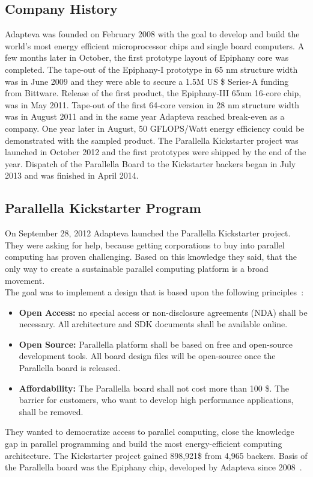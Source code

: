 \documentclass[american, hauptseminar, twoside]{zihpub}
\begin{document}
		\subsection{Company History}
			Adapteva was founded on February 2008 with the goal to develop and build the world's most energy efficient microprocessor chips and single board computers. A few months later in October, the first prototype layout of Epiphany core was completed. The tape-out of the Epiphany-I prototype in 65 nm structure width was in June 2009 and they were able to secure a 1.5M US \$ Series-A funding from Bittware. Release of the first product, the Epiphany-III 65nm 16-core chip, was in May 2011. Tape-out of the first 64-core version in 28 nm structure width was in August 2011 and in the same year Adapteva reached break-even as a company. One year later in August, 50 GFLOPS/Watt energy efficiency could be demonstrated with the sampled product.
			The Parallella Kickstarter project was launched in October 2012 and the first prototypes were shipped by the end of the year. Dispatch of the Parallella Board to the Kickstarter backers began in July 2013 and was finished in April 2014.~\cite{Adaptev2015}
			
		\subsection{Parallella Kickstarter Program}
			On September 28, 2012 Adapteva launched the Parallella Kickstarter project. They were asking for help, because getting corporations to buy into parallel computing has proven challenging. Based on this knowledge they said, that the only way to create a sustainable parallel computing platform is a broad movement. 
			\\
			The goal was to implement a design that is based upon the following principles~\cite{Adaptev2012}:
			\begin{itemize}
				\item \textbf{Open Access:} no special access or non-disclosure agreements (NDA) shall be necessary. All architecture and SDK documents shall be available online.
				\item \textbf{Open Source:} Parallella platform shall be based on free and open-source development tools. All board design files will be open-source once the Parallella board is released.
				\item \textbf{Affordability:} The Parallella board shall not cost more than 100 \$. The barrier for customers, who want to develop high performance applications, shall be removed.
			\end{itemize}
			They wanted to democratize access to parallel computing, close the knowledge gap in parallel programming and build the most energy-efficient computing architecture. The Kickstarter project gained 898,921\$ from 4,965 backers. Basis of the Parallella board was the Epiphany chip, developed by Adapteva since 2008~\cite{Adaptev2012}.
		
\end{document}
